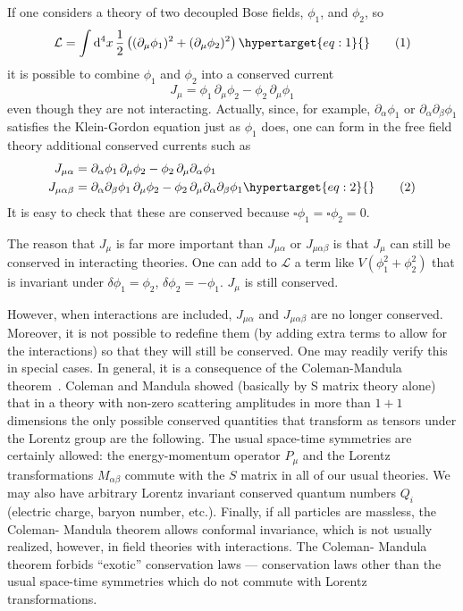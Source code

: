 \documentclass[11pt,a4paper]{article}
\newcommand{\eqtarget}[1]{\hypertarget{eq:#1}{\mathstrut}\tag{#1}}
\newcommand{\dd}{\mathop{}\!\mathrm{d}}
\begin{document}
If one considers a theory of two decoupled Bose fields, $\phi_1$, and
$\phi_2$, so
\begin{equation}
\mathcal{L} = \int \dd^4x \, \frac{1}{2}\left((\partial_\mu \phi_1)^2 + (\partial_\mu \phi_2)^2\right)
\eqtarget{1}
\end{equation}
it is possible to combine $\phi_1$ and $\phi_2$ into a conserved current
\[
J_\mu = \phi_1\, \partial_\mu \phi_2 - \phi_2\, \partial_\mu \phi_1
\]
even though they are not interacting.
Actually, since, for example, $\partial_\alpha \phi_1$ or
$\partial_\alpha \partial_\beta \phi_1$ satisfies the Klein-Gordon
equation just as $\phi_1$ does, one can form in the free field
theory additional conserved currents such as
\begin{align}
J_{\mu\alpha} &= \partial_\alpha \phi_1\, \partial_\mu \phi_2 - \phi_2\, \partial_\mu \partial_\alpha \phi_1 \notag\\
J_{\mu\alpha\beta} &= \partial_\alpha \partial_\beta \phi_1\, \partial_\mu \phi_2 - \phi_2\, \partial_\mu \partial_\alpha \partial_\beta \phi_1
\eqtarget{2}
\end{align}
It is easy to check that these are conserved because
$\square \phi_1 = \square \phi_2 = 0$.

The reason that $J_\mu$ is far more important than $J_{\mu\alpha}$ or
$J_{\mu\alpha\beta}$ is that $J_\mu$ can still be conserved in interacting
theories. One can add to $\mathcal{L}$ a term like $V(\phi_1^2 + \phi_2^2)$
that is invariant under $\delta \phi_1 = \phi_2$, $\delta \phi_2 = -\phi_1$.
$J_\mu$ is still conserved.

However, when interactions are included, $J_{\mu\alpha}$ and $J_{\mu\alpha\beta}$
are no longer conserved. Moreover, it is not possible to redefine them (by
adding extra terms to allow for the interactions) so that they will still be
conserved. One may readily verify this in special cases. In general, it is a
consequence of the Coleman-Mandula theorem~\cite{ref3}. Coleman and
Mandula showed (basically by S matrix theory alone) that in a theory with
non-zero scattering amplitudes in more than $1+1$ dimensions the only possible conserved quantities that transform as
tensors under the Lorentz group are the following. The usual space-time 
symmetries are certainly allowed: the energy-momentum operator
$P_\mu$ and the Lorentz transformations $M_{\alpha\beta}$ commute with the
$S$ matrix in all of our usual theories. We may also have arbitrary Lorentz
invariant conserved quantum numbers $Q_i$ (electric charge, baryon
number, etc.). Finally, if all particles are massless, the Coleman-
Mandula theorem allows conformal invariance, which is not usually
realized, however, in field theories with interactions. The Coleman-
Mandula theorem forbids ``exotic'' conservation laws --- conservation
laws other than the usual space-time symmetries which do not commute
with Lorentz transformations.
\end{document}
